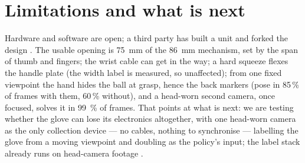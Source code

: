 \documentclass{article}
\begin{document}
\section{Limitations and what is next}
\label{sec:discussion}
Hardware \citep{yamumi2026} and software \citep{forwardcamumi2026} are open; a third party has built a unit and forked the design \citep{tinyumi2026}. The usable opening is \SI{75}{mm} of the \SI{86}{mm} mechanism, set by the span of thumb and fingers; the wrist cable can get in the way; a hard squeeze flexes the handle plate (the width label is measured, so unaffected); from one fixed viewpoint the hand hides the ball at grasp, hence the back markers (pose in 85\,\% of frames with them, 60\,\% without), and a head-worn second camera, once focused, solves it in \SI{99}{\percent} of frames. That points at what is next: we are testing whether the glove can lose its electronics altogether, with one head-worn camera as the only collection device --- no cables, nothing to synchronise --- labelling the glove from a moving viewpoint and doubling as the policy's input; the label stack already runs on head-camera footage \citep{forwardcamumi2026}.


\end{document}
